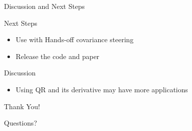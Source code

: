 \documentclass{beamer}
\begin{document}
\begin{frame}{Discussion and Next Steps}
    \begin{block}{Next Steps}
        \begin{itemize}
            \item Use with Hands-off covariance steering
            \item Release the code and paper
        \end{itemize}
    \end{block}
\begin{block}{Discussion}
    \begin{itemize}
        \item Using QR and its derivative may have more applications
    \end{itemize}
\end{block}
\end{frame}

\begin{frame}[plain]
    \centering
    \vspace{2cm}
    
    \Huge Thank You!
    
    \vspace{1cm}
    
    \Large Questions?
    
    \vspace{1.5cm}
    
\end{frame}
\end{document}
